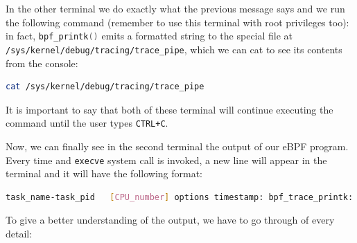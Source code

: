 In the other terminal we do exactly what the previous message says and we run the following command (remember to use this terminal with root privileges too): in fact, \colorbox{backcolour}{\lstinline[style=cstyle, language=C]|bpf_printk()|} emits a formatted string to the special file at \colorbox{backcolour}{\lstinline[style=highlight, language=bash]|/sys/kernel/debug/tracing/trace_pipe|}, which we can cat to see its contents from the console:

\begin{lstlisting}[style=commandline, language=bash, caption={libbpf-bootstrap program successful execution message}]
	cat /sys/kernel/debug/tracing/trace_pipe
\end{lstlisting}

It is important to say that both of these terminal will continue executing the command until the user types \colorbox{backcolour}{\lstinline[style=highlight, language=bash]|CTRL+C|}.

Now, we can finally see in the second terminal the output of our eBPF program.
Every time and \colorbox{backcolour}{\lstinline[style=highlight, language=bash]|execve|} system call is invoked, a new line will appear in the terminal and it will have the following format:

\begin{lstlisting}[style=commandline, language=bash, caption={bpf\_printk output message}]
	task_name-task_pid   [CPU_number] options timestamp: bpf_trace_printk: invoke bpf_prog: Hello, World!
\end{lstlisting}

To give a better understanding of the output, we have to go through of every detail:

